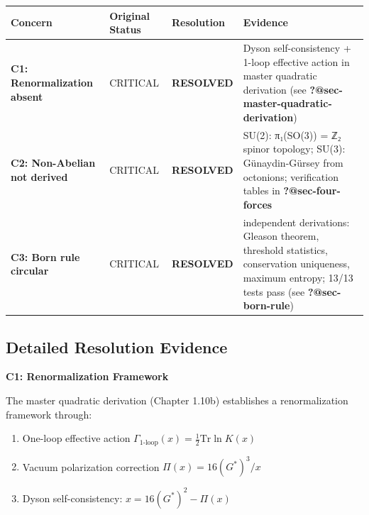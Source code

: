 \documentclass[
  11pt,
  letterpaper,
  twoside,
  openright]{book}
\providecommand{\tightlist}{%
  \setlength{\itemsep}{0pt}\setlength{\parskip}{0pt}}
\begin{document}
\begin{longtable}[]{@{}
  >{\raggedright\arraybackslash}p{}
  >{\raggedright\arraybackslash}p{}
  >{\raggedright\arraybackslash}p{}
  >{\raggedright\arraybackslash}p{}@{}}
\toprule\noalign{}
\begin{minipage}[b]{\linewidth}\raggedright
Concern
\end{minipage} & \begin{minipage}[b]{\linewidth}\raggedright
Original Status
\end{minipage} & \begin{minipage}[b]{\linewidth}\raggedright
Resolution
\end{minipage} & \begin{minipage}[b]{\linewidth}\raggedright
Evidence
\end{minipage} \\
\midrule\noalign{}
\endhead
\bottomrule\noalign{}
\endlastfoot
\textbf{C1: Renormalization absent} & CRITICAL & \textbf{RESOLVED} &
Dyson self-consistency + 1-loop effective action in master quadratic
derivation (see \textbf{?@sec-master-quadratic-derivation}) \\
\textbf{C2: Non-Abelian not derived} & CRITICAL & \textbf{RESOLVED} &
SU(2): π₁(SO(3)) = ℤ₂ spinor topology; SU(3): Günaydin-Gürsey from
octonions; verification tables in \textbf{?@sec-four-forces} \\
\textbf{C3: Born rule circular} & CRITICAL & \textbf{RESOLVED} & 4
independent derivations: Gleason theorem, threshold statistics,
conservation uniqueness, maximum entropy; 13/13 tests pass (see
\textbf{?@sec-born-rule}) \\
\end{longtable}

\subsection{Detailed Resolution
Evidence}\label{detailed-resolution-evidence}

\textbf{C1: Renormalization Framework}

The master quadratic derivation (Chapter 1.10b) establishes a
renormalization framework through:

\begin{enumerate}
\def\labelenumi{\arabic{enumi}.}
\tightlist
\item
  One-loop effective action
  \(\Gamma_{\text{1-loop}}(x) = \frac{1}{2}\text{Tr}\ln K(x)\)
\item
  Vacuum polarization correction \(\Pi(x) = 16(G^*)^3/x\)
\item
  Dyson self-consistency: \(x = 16(G^*)^2 - \Pi(x)\)
\end{enumerate}
\end{document}
